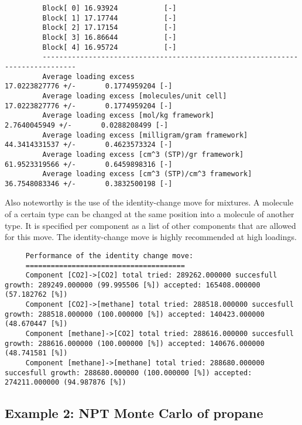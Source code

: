 \begin{tiny}
\begin{verbatim}
         Block[ 0] 16.93924           [-]
         Block[ 1] 17.17744           [-]
         Block[ 2] 17.17154           [-]
         Block[ 3] 16.86644           [-]
         Block[ 4] 16.95724           [-]
         ------------------------------------------------------------------------------
         Average loading excess                             17.0223827776 +/-       0.1774959204 [-]
         Average loading excess [molecules/unit cell]       17.0223827776 +/-       0.1774959204 [-]
         Average loading excess [mol/kg framework]                    2.7640045949 +/-       0.0288208499 [-]
         Average loading excess [milligram/gram framework]           44.3414331537 +/-       0.4623573324 [-]
         Average loading excess [cm^3 (STP)/gr framework]            61.9523319566 +/-       0.6459898316 [-]
         Average loading excess [cm^3 (STP)/cm^3 framework]          36.7548083346 +/-       0.3832500198 [-]
\end{verbatim}
\end{tiny}

Also noteworthy is the use of the identity-change move for mixtures. A molecule of a certain type can be changed at the same position into a molecule of
another type. It is specified per component as a list of other components that are allowed for this move. The identity-change move is highly recommended
at high loadings.
\begin{tiny}
\begin{verbatim}
     Performance of the identity change move:
     ======================================
     Component [CO2]->[CO2] total tried: 289262.000000 succesfull growth: 289249.000000 (99.995506 [%]) accepted: 165408.000000 (57.182762 [%])
     Component [CO2]->[methane] total tried: 288518.000000 succesfull growth: 288518.000000 (100.000000 [%]) accepted: 140423.000000 (48.670447 [%])
     Component [methane]->[CO2] total tried: 288616.000000 succesfull growth: 288616.000000 (100.000000 [%]) accepted: 140676.000000 (48.741581 [%])
     Component [methane]->[methane] total tried: 288680.000000 succesfull growth: 288680.000000 (100.000000 [%]) accepted: 274211.000000 (94.987876 [%])
\end{verbatim}
\end{tiny}

\subsection*{Example 2: NPT Monte Carlo of propane}


